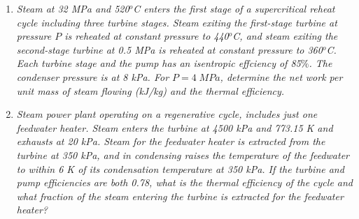 \begin{enumerate}


\item {\it Steam at 32 MPa and 520$^{o}$C enters the first stage of a supercritical reheat cycle including three turbine stages. Steam exiting the first-stage turbine at pressure $P$ is reheated at constant pressure to 440$^{o}$C, and steam exiting the second-stage turbine at 0.5 MPa is reheated at constant pressure to 360$^{o}$C.  Each turbine stage and the pump has an isentropic effciency of 85$\%$. The condenser pressure is at 8 kPa. For $P=4\;MPa$, determine the net work per unit mass of steam flowing (kJ/kg) and the thermal efficiency.}


\item \label{P:example8_9}{\it Steam power plant operating on a regenerative cycle, includes just one feedwater heater. Steam enters the turbine at 4500 kPa and 773.15 K and exhausts at 20 kPa. Steam for the feedwater heater is extracted from the turbine at 350 kPa, and in condensing raises the temperature of the feedwater to within 6 K of its condensation temperature at 350 kPa. If the turbine and pump efficiencies are both 0.78, what is the thermal efficiency of the cycle and what fraction of the steam entering the turbine is extracted for the feedwater heater?}




\end{enumerate}
